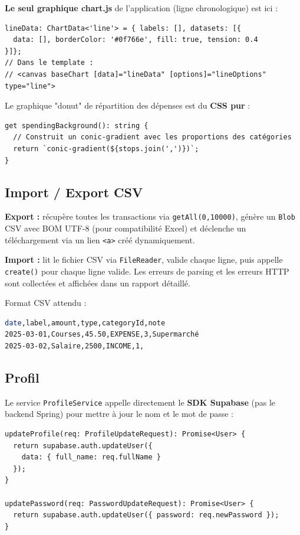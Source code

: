\documentclass[12pt,a4paper]{article}
\begin{document}
\textbf{Le seul graphique chart.js} de l'application (ligne chronologique) est ici :
\begin{lstlisting}
lineData: ChartData<'line'> = { labels: [], datasets: [{
  data: [], borderColor: '#0f766e', fill: true, tension: 0.4
}]};
// Dans le template :
// <canvas baseChart [data]="lineData" [options]="lineOptions" type="line">
\end{lstlisting}

Le graphique "donut" de répartition des dépenses est du \textbf{CSS pur} :
\begin{lstlisting}
get spendingBackground(): string {
  // Construit un conic-gradient avec les proportions des catégories
  return `conic-gradient(${stops.join(',')})`;
}
\end{lstlisting}

\subsection{Import / Export CSV}

\textbf{Export :} récupère toutes les transactions via \texttt{getAll(0,10000)},
génère un \texttt{Blob} CSV avec BOM UTF-8 (pour compatibilité Excel) et déclenche
un téléchargement via un lien \texttt{<a>} créé dynamiquement.

\textbf{Import :} lit le fichier CSV via \texttt{FileReader}, valide chaque ligne,
puis appelle \texttt{create()} pour chaque ligne valide.
Les erreurs de parsing et les erreurs HTTP sont collectées et affichées dans un
rapport détaillé.

Format CSV attendu :
\begin{lstlisting}[language=bash, numbers=none]
date,label,amount,type,categoryId,note
2025-03-01,Courses,45.50,EXPENSE,3,Supermarché
2025-03-02,Salaire,2500,INCOME,1,
\end{lstlisting}

\subsection{Profil}

Le service \texttt{ProfileService} appelle directement le \textbf{SDK Supabase}
(pas le backend Spring) pour mettre à jour le nom et le mot de passe :

\begin{lstlisting}
updateProfile(req: ProfileUpdateRequest): Promise<User> {
  return supabase.auth.updateUser({
    data: { full_name: req.fullName }
  });
}

updatePassword(req: PasswordUpdateRequest): Promise<User> {
  return supabase.auth.updateUser({ password: req.newPassword });
}
\end{lstlisting}
\end{document}
